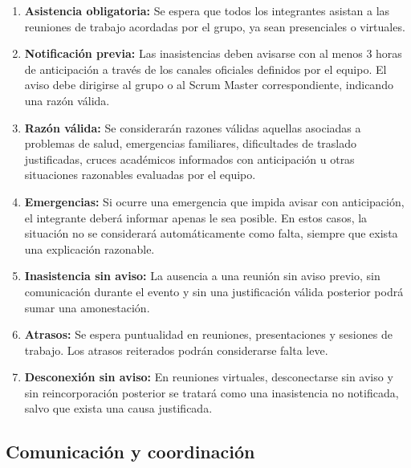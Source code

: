 \documentclass[12pt,a4paper]{article}
\begin{document}
\begin{enumerate}
    \item \textbf{Asistencia obligatoria:} Se espera que todos los integrantes asistan a las reuniones de trabajo acordadas por el grupo, ya sean presenciales o virtuales.

    \item \textbf{Notificación previa:} Las inasistencias deben avisarse con al menos 3 horas de anticipación a través de los canales oficiales definidos por el equipo. El aviso debe dirigirse al grupo o al Scrum Master correspondiente, indicando una razón válida.

    \item \textbf{Razón válida:} Se considerarán razones válidas aquellas asociadas a problemas de salud, emergencias familiares, dificultades de traslado justificadas, cruces académicos informados con anticipación u otras situaciones razonables evaluadas por el equipo.

    \item \textbf{Emergencias:} Si ocurre una emergencia que impida avisar con anticipación, el integrante deberá informar apenas le sea posible. En estos casos, la situación no se considerará automáticamente como falta, siempre que exista una explicación razonable.

    \item \textbf{Inasistencia sin aviso:} La ausencia a una reunión sin aviso previo, sin comunicación durante el evento y sin una justificación válida posterior podrá sumar una amonestación.

    \item \textbf{Atrasos:} Se espera puntualidad en reuniones, presentaciones y sesiones de trabajo. Los atrasos reiterados podrán considerarse falta leve.

    \item \textbf{Desconexión sin aviso:} En reuniones virtuales, desconectarse sin aviso y sin reincorporación posterior se tratará como una inasistencia no notificada, salvo que exista una causa justificada.
\end{enumerate}

\subsection{Comunicación y coordinación}
\end{document}
